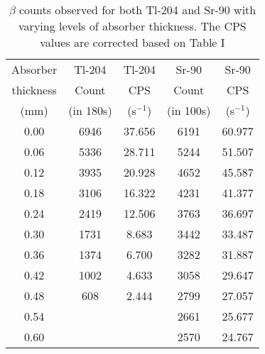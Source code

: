 \begin{table}[]
    \centering
    \begin{tabular}{|c|c|c|c|c|}
    \hline
    Absorber & Tl-204 & Tl-204 & Sr-90 & Sr-90 \\
    thickness & Count  & CPS & Count  & CPS \\
    (mm) & (in 180s) & (s$^{-1}$) & (in 100s) & (s$^{-1}$) \\ \hline
    0.00 & 6946 & 37.656 & 6191 & 60.977 \\ 
    0.06 & 5336 & 28.711 & 5244 & 51.507 \\ 
    0.12 & 3935 & 20.928 & 4652 & 45.587 \\ 
    0.18 & 3106 & 16.322 & 4231 & 41.377 \\ 
    0.24 & 2419 & 12.506 & 3763 & 36.697 \\ 
    0.30 & 1731 & 8.683 & 3442 & 33.487 \\ 
    0.36 & 1374 & 6.700 & 3282 & 31.887 \\ 
    0.42 & 1002 & 4.633 & 3058 & 29.647 \\ 
    0.48 & 608 & 2.444 & 2799 & 27.057 \\ 
    0.54 &  &  & 2661 & 25.677 \\ 
    0.60 &  &  & 2570 & 24.767 \\ \hline
    \end{tabular}
    \caption{$\beta$ counts observed for both Tl-204 and Sr-90 with varying levels of absorber thickness. The CPS values are corrected based on Table I}
    \label{tab:2}
\end{table}